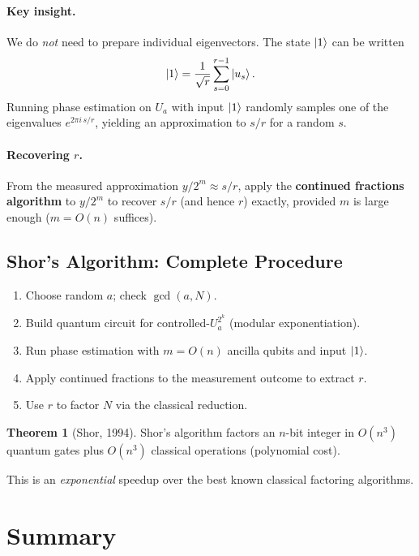 \documentclass[11pt]{article}
\theoremstyle{definition}
\newtheorem{theorem}{Theorem}[section]
\begin{document}
\paragraph{Key insight.}  We do \emph{not} need to prepare individual eigenvectors.  The state $\ket{1}$ can be written
\[
    \ket{1} = \frac{1}{\sqrt{r}}\sum_{s=0}^{r-1}\ket{u_s}.
\]
Running phase estimation on $U_a$ with input $\ket{1}$ randomly samples one of the eigenvalues $e^{2\pi i\,s/r}$, yielding an approximation to $s/r$ for a random $s$.

\paragraph{Recovering $r$.}  From the measured approximation $y/2^m\approx s/r$, apply the \textbf{continued fractions algorithm} to $y/2^m$ to recover $s/r$ (and hence $r$) exactly, provided $m$ is large enough ($m=O(n)$ suffices).

\subsection{Shor's Algorithm: Complete Procedure}

\begin{enumerate}
    \item Choose random $a$; check $\gcd(a,N)$.
    \item Build quantum circuit for controlled-$U_a^{2^k}$ (modular exponentiation).
    \item Run phase estimation with $m=O(n)$ ancilla qubits and input $\ket{1}$.
    \item Apply continued fractions to the measurement outcome to extract $r$.
    \item Use $r$ to factor $N$ via the classical reduction.
\end{enumerate}

\begin{theorem}[Shor, 1994]
Shor's algorithm factors an $n$-bit integer in $O(n^3)$ quantum gates plus $O(n^3)$ classical operations (polynomial cost).
\end{theorem}

This is an \emph{exponential} speedup over the best known classical factoring algorithms.

\section{Summary}
\end{document}

